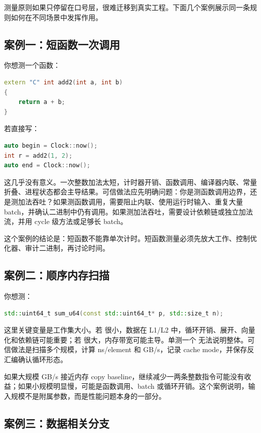 测量原则如果只停留在口号层，很难迁移到真实工程。下面几个案例展示同一条规则如何在不同场景中发挥作用。

\subsection{案例一：短函数一次调用}

你想测一个函数：

\begin{lstlisting}[language=C++]
extern "C" int add2(int a, int b)
{
    return a + b;
}
\end{lstlisting}

若直接写：

\begin{lstlisting}[language=C++]
auto begin = Clock::now();
int r = add2(1, 2);
auto end = Clock::now();
\end{lstlisting}

这几乎没有意义。一次整数加法太短，计时器开销、函数调用、编译器内联、常量折叠、进程状态都会主导结果。可信做法应先明确问题：你是测函数调用边界，还是测加法吞吐？如果测函数调用，需要阻止内联、使用运行时输入、重复大量 batch，并确认二进制中仍有调用。如果测加法吞吐，需要设计依赖链或独立加法流，并用 cycle 级方法或足够长 batch。

这个案例的结论是：短函数不能靠单次计时。短函数测量必须先放大工作、控制优化器、审计二进制，再讨论时间。

\subsection{案例二：顺序内存扫描}

你想测：

\begin{lstlisting}[language=C++]
std::uint64_t sum_u64(const std::uint64_t* p, std::size_t n);
\end{lstlisting}

这里关键变量是工作集大小。若  很小，数据在 L1/L2 中，循环开销、展开、向量化和依赖链可能重要；若  很大，内存带宽可能主导。单测一个  无法说明整体。可信做法是扫描多个规模，计算 ns/element 和 GB/s，记录 cache mode，并保存反汇编确认循环形态。

如果大规模 GB/s 接近内存 copy baseline，继续减少一两条整数指令可能没有收益；如果小规模明显慢，可能是函数调用、batch 或循环开销。这个案例说明，输入规模不是附属参数，而是性能问题本身的一部分。

\subsection{案例三：数据相关分支}


